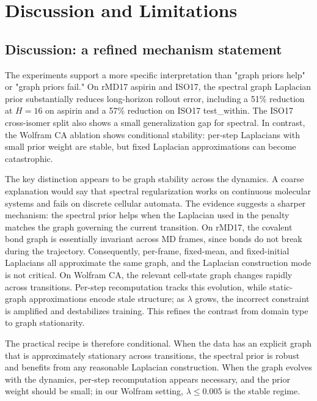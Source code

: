 \section{Discussion and Limitations}\label{sec:discussion}

\subsection{Discussion: a refined mechanism statement}\label{sec:discussion_mechanism}

The experiments support a more specific interpretation than "graph priors help" or "graph priors fail." On rMD17 aspirin and ISO17, the spectral graph Laplacian prior substantially reduces long-horizon rollout error, including a 51\% reduction at \(H=16\) on aspirin and a 57\% reduction on ISO17 test\_within. The ISO17 cross-isomer split also shows a small generalization gap for spectral. In contrast, the Wolfram CA ablation shows conditional stability: per-step Laplacians with small prior weight are stable, but fixed Laplacian approximations can become catastrophic.

The key distinction appears to be graph stability across the dynamics. A coarse explanation would say that spectral regularization works on continuous molecular systems and fails on discrete cellular automata. The evidence suggests a sharper mechanism: the spectral prior helps when the Laplacian used in the penalty matches the graph governing the current transition. On rMD17, the covalent bond graph is essentially invariant across MD frames, since bonds do not break during the trajectory. Consequently, per-frame, fixed-mean, and fixed-initial Laplacians all approximate the same graph, and the Laplacian construction mode is not critical. On Wolfram CA, the relevant cell-state graph changes rapidly across transitions. Per-step recomputation tracks this evolution, while static-graph approximations encode stale structure; as \(\lambda\) grows, the incorrect constraint is amplified and destabilizes training. This refines the contrast from domain type to graph stationarity.

The practical recipe is therefore conditional. When the data has an explicit graph that is approximately stationary across transitions, the spectral prior is robust and benefits from any reasonable Laplacian construction. When the graph evolves with the dynamics, per-step recomputation appears necessary, and the prior weight should be small; in our Wolfram setting, \(\lambda \leq 0.005\) is the stable regime.

